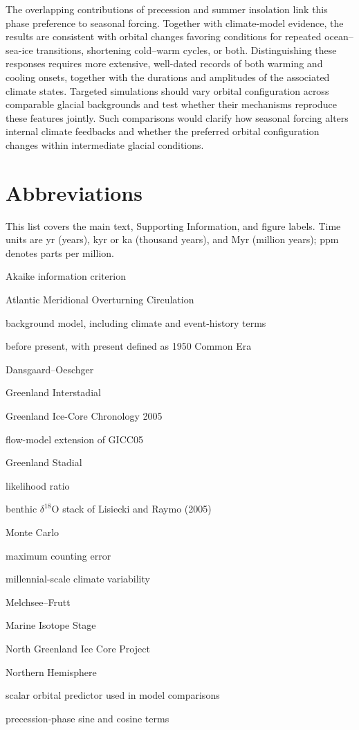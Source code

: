 \documentclass[11pt]{article}
\begin{document}
The overlapping contributions of precession and summer insolation link this phase preference to seasonal forcing. Together with climate-model evidence, the results are consistent with orbital changes favoring conditions for repeated ocean--sea-ice transitions, shortening cold--warm cycles, or both. Distinguishing these responses requires more extensive, well-dated records of both warming and cooling onsets, together with the durations and amplitudes of the associated climate states. Targeted simulations should vary orbital configuration across comparable glacial backgrounds and test whether their mechanisms reproduce these features jointly. Such comparisons would clarify how seasonal forcing alters internal climate feedbacks and whether the preferred orbital configuration changes within intermediate glacial conditions.


\section*{Abbreviations}

This list covers the main text, Supporting Information, and figure labels. Time units are yr (years), kyr or ka (thousand years), and Myr (million years); ppm denotes parts per million.

\begin{description}
\setlength{\itemsep}{0pt}
\setlength{\parsep}{0pt}
\item[AIC] Akaike information criterion
\item[AMOC] Atlantic Meridional Overturning Circulation
\item[BG] background model, including climate and event-history terms
\item[BP] before present, with present defined as 1950 Common Era
\item[DO] Dansgaard--Oeschger
\item[GI] Greenland Interstadial
\item[GICC05] Greenland Ice-Core Chronology 2005
\item[GICC05modelext] flow-model extension of GICC05
\item[GS] Greenland Stadial
\item[LR] likelihood ratio
\item[LR04] benthic $\delta^{18}$O stack of Lisiecki and Raymo (2005)
\item[MC] Monte Carlo
\item[MCE] maximum counting error
\item[MCV] millennial-scale climate variability
\item[MF] Melchsee--Frutt
\item[MIS] Marine Isotope Stage
\item[NGRIP] North Greenland Ice Core Project
\item[NH] Northern Hemisphere
\item[Orb] scalar orbital predictor used in model comparisons
\item[Pre] precession-phase sine and cosine terms
\end{description}
\end{document}
